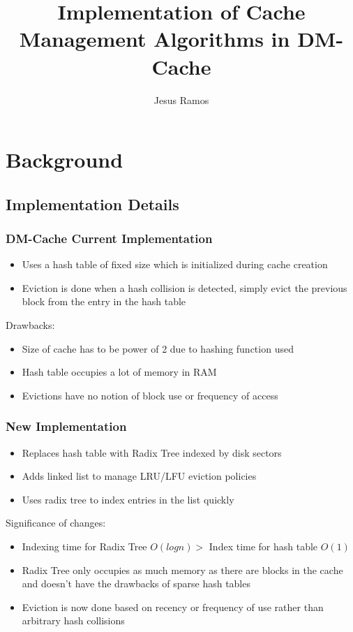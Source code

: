\documentclass{beamer}
\title[Cache Management]{Implementation of Cache Management Algorithms in
  DM-Cache}
\author{Jesus Ramos}
\institute[FIU]{Florida International University}
\date{}
\begin{document}
\maketitle

\section{Background}

\subsection{Implementation Details}

\begin{frame}
  \frametitle{DM-Cache Current Implementation}

  \begin{itemize}
    \item Uses a hash table of fixed size which is initialized during cache
    creation
    \item Eviction is done when a hash collision is detected, simply evict the
    previous block from the entry in the hash table
  \end{itemize}

  Drawbacks:
  \begin{itemize}
    \item Size of cache has to be power of 2 due to hashing function used
    \item Hash table occupies a lot of memory in RAM
    \item Evictions have no notion of block use or frequency of access
  \end{itemize}

\end{frame}

\begin{frame}
  \frametitle{New Implementation}

  \begin{itemize}
    \item Replaces hash table with Radix Tree indexed by disk sectors
    \item Adds linked list to manage LRU/LFU eviction policies
    \item Uses radix tree to index entries in the list quickly
  \end{itemize}

  Significance of changes:
  \begin{itemize}
    \item Indexing time for Radix Tree $O(logn) >$ Index time for hash table $O(1)$
    \item Radix Tree only occupies as much memory as there are blocks in the
    cache and doesn't have the drawbacks of sparse hash tables
    \item Eviction is now done based on recency or frequency of use rather than
    arbitrary hash collisions
  \end{itemize}

\end{frame}
\end{document}
